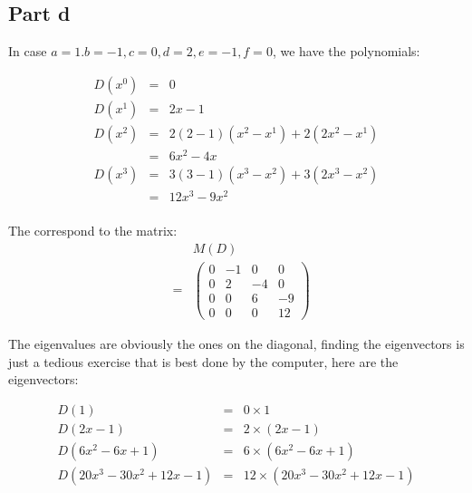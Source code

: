 \subsection*{Part d}
In case $ a = 1. b = -1, c = 0, d = 2, e = -1, f = 0 $, we have the polynomials:

\begin{eqnarray*}
  D(x^0) &=& 0 \\
  D(x^1) &=& 2x - 1 \\
  D(x^2) &=& 2(2-1)(x^2 - x^1) + 2(2x^2 - x^1) \\
         &=& 6x^2 - 4x \\
  D(x^3) &=& 3(3-1)(x^3 - x^2) + 3(2x^3 - x^2) \\
        &=& 12x^3 - 9x^2 \\
\end{eqnarray*}

The correspond to the matrix:
\begin{eqnarray*}
  & & M(D) \\
  &=& \left(\begin{array}{cccc}
    0 & -1 &  0 & 0  \\
    0 & 2  & -4 & 0  \\
    0 & 0  &  6 & -9 \\
    0 & 0  &  0 & 12
      \end{array}\right)
\end{eqnarray*}

The eigenvalues are obviously the ones on the diagonal, finding the eigenvectors is just a tedious exercise that is best done by the computer, here are the eigenvectors:

\begin{eqnarray*}
  D(1) &=& 0 \times 1 \\
  D(2x - 1) &=& 2 \times (2x - 1) \\
  D(6x^2 - 6x + 1) &=& 6 \times (6x^2 - 6x + 1) \\
  D(20x^3 - 30x^2 + 12x - 1) &=& 12 \times (20x^3 - 30x^2 + 12x - 1)
\end{eqnarray*}